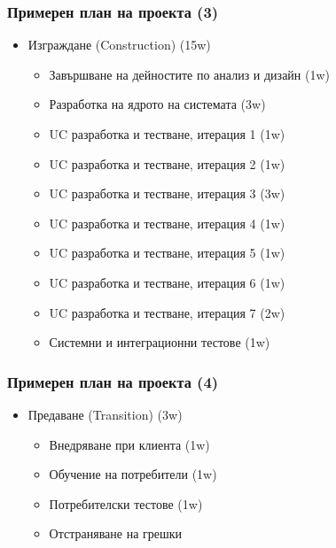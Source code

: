 \documentclass[12pt]{beamer}
\begin{document}
\begin{frame}[fragile]
\frametitle{Примерен план на проекта (3)}
\begin{itemize}
\item {Изграждане (Construction) (15w) %
\begin{itemize}
\item Завършване на дейностите по анализ и дизайн (1w)
\item Разработка на ядрото на системата (3w)
\item UC разработка и тестване, итерация 1 (1w)
\item UC разработка и тестване, итерация 2 (1w)
\item UC разработка и тестване, итерация 3 (3w)
\item UC разработка и тестване, итерация 4 (1w)
\item UC разработка и тестване, итерация 5 (1w)
\item UC разработка и тестване, итерация 6 (1w)
\item UC разработка и тестване, итерация 7 (2w)
\item Системни и интеграционни тестове (1w)
\end{itemize}
}

\end{itemize}
\end{frame}

\begin{frame}[fragile]
\frametitle{Примерен план на проекта (4)}
\begin{itemize}

\item {Предаване (Transition) (3w) %
\begin{itemize}
	\item Внедряване при клиента (1w)
	\item Обучение на потребители (1w)
	\item Потребителски тестове (1w)
	\item Отстраняване на грешки
\end{itemize}
}
\end{itemize}
\end{frame}
\end{document}
